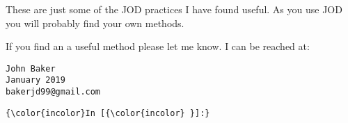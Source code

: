 \documentclass[11pt,letter,landscape]{article}
\begin{document}
These are just some of the JOD practices I have found useful. As you use
JOD you will probably find your own methods.

If you find an a useful method please let me know. I can be reached at:

\begin{verbatim}
John Baker 
January 2019
bakerjd99@gmail.com
\end{verbatim}

    \begin{Verbatim}[commandchars=\\\{\}]
{\color{incolor}In [{\color{incolor} }]:} 
\end{Verbatim}


    
    
    
    
\end{document}
